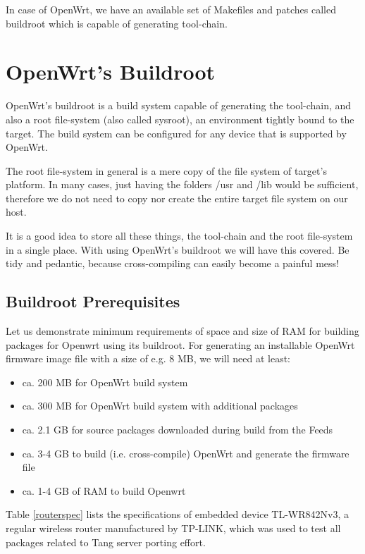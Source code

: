 In case of OpenWrt, we have an available set of Makefiles and patches called buildroot which is capable of generating tool-chain.



\section{OpenWrt's Buildroot}

OpenWrt's buildroot is a build system capable of generating the tool-chain, and also a root file-system (also called sysroot), an environment tightly bound to the target.
The build system can be configured for any device that is supported by OpenWrt.

The root file-system in general is a mere copy of the file system of target's platform.
In many cases, just having the folders /usr and /lib would be sufficient, therefore we do not need to copy nor create the entire target file system on our host.

It is a good idea to store all these things, the tool-chain and the root file-system in a single place.
With using OpenWrt's buildroot we will have this covered.
Be tidy and pedantic, because cross-compiling can easily become a painful mess!\cite{fabrizio}



\subsection{Buildroot Prerequisites}

Let us demonstrate minimum requirements of space and size of RAM for building packages for Openwrt using its buildroot.
For generating an installable OpenWrt firmware image file with a size of e.g. 8 MB, we will need at least:
\begin{itemize}
\item ca. 200 MB for OpenWrt build system
\item ca. 300 MB for OpenWrt build system with additional packages
\item ca. 2.1 GB for source packages downloaded during build from the Feeds
\item ca. 3-4 GB to build (i.e. cross-compile) OpenWrt and generate the firmware file
\item ca. 1-4 GB of RAM to build Openwrt
\end{itemize}

Table \ref{routerspec} lists the specifications of embedded device TL-WR842Nv3, a regular wireless router manufactured by TP-LINK, which was used to test all packages related to Tang server porting effort.

